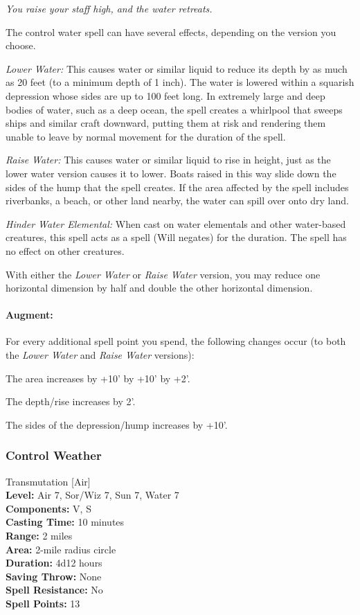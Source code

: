\emph{You raise your staff high, and the water retreats.}

The control water spell can have several effects, depending on the version you choose.
\begin{list}{}{\leftmargin=1em}
 \item \emph{Lower Water:} This causes water or similar liquid to reduce its depth by as much as 20 feet (to a minimum depth of 1 inch). 
The water is lowered within a squarish depression whose sides are up to 100 feet long.
In extremely large and deep bodies of water, such as a deep ocean, the spell creates a whirlpool that sweeps ships and similar craft downward, 
putting them at risk and rendering them unable to leave by normal movement for the duration of the spell. 
 \item \emph{Raise Water:}
This causes water or similar liquid to rise in height, just as the lower water version causes it to lower. 
Boats raised in this way slide down the sides of the hump that the spell creates. 
If the area affected by the spell includes riverbanks, a beach, or other land nearby, the water can spill over onto dry land.
 \item \emph{Hinder Water Elemental:} 
When cast on water elementals and other water-based creatures, this spell acts as a  spell (Will negates) for the duration. 
The spell has no effect on other creatures.
\end{list}
With either the \emph{Lower Water} or \emph{Raise Water} version, you may reduce one horizontal dimension by half and double the other horizontal dimension. 

\paragraph{Augment:} For every additional spell point you spend, the following changes occur (to both the \emph{Lower Water} and \emph{Raise Water} versions):
\begin{list}{}{\leftmargin=1em}
 \item The area increases by +10' by +10' by +2'.
 \item The depth/rise increases by 2'.
 \item The sides of the depression/hump increases by +10'.
\end{list}
\subsubsection{Control Weather}
\label{Spell:ControlWeather}
Transmutation [Air]
\\ \textbf{Level:} Air 7, Sor/Wiz 7, Sun 7, Water 7
\\ \textbf{Components:} V, S
\\ \textbf{Casting Time:} 10 minutes
\\ \textbf{Range:} 2 miles
\\ \textbf{Area:} 2-mile radius circle
\\ \textbf{Duration:} 4d12 hours
\\ \textbf{Saving Throw:} None
\\ \textbf{Spell Resistance:} No
\\ \textbf{Spell Points:} 13

